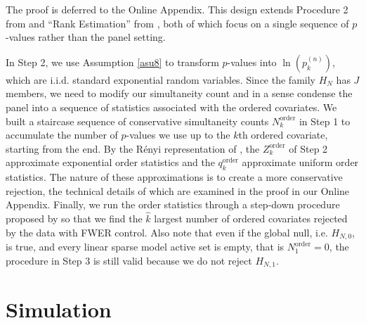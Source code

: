 \documentclass[11pt]{article}
\def\cmt#1{{\textcolor{red}{(#1)}}}
\begin{document}
	
	The proof is deferred to the Online Appendix. This design extends Procedure 2 from \cite{rssb.12122} and ``Rank Estimation'' from \cite{16-AOS1536}, both of which focus on a single sequence of $p$-values rather than the panel setting.
	
	In Step 2, we use Assumption \ref{asu8} to transform $p$-values into $\ln(p^{(n)}_k)$, which are i.i.d. standard exponential random variables. Since the family $H_{N}$ has $J$ members, we need to modify our simultaneity count and in a sense condense the panel into a sequence of statistics associated with the ordered covariates. We built a staircase sequence of conservative simultaneity counts ${N}_k^{\text{order}}$ in Step 1 to accumulate the number of $p$-values we use up to the $k$th ordered covariate, starting from the end. By the R\'enyi representation of \cite{Rnyi1953OnTT}, the ${Z}_k^{\text{order}}$ of Step 2 approximate exponential order statistics and the ${q}_k^{\text{order}}$ approximate uniform order statistics. The nature of these approximations is to create a more conservative rejection, the technical details of which are examined in the proof in our Online Appendix. Finally, we run the order statistics through a step-down procedure proposed by \cite{2336545} so that we find the $\hat{k}$ largest number of ordered covariates rejected by the data with FWER control. Also note that even if the global null, i.e. $H_{N,0}$, is true, and every linear sparse model active set is empty, that is ${N}^{\text{order}}_1=0$, the procedure in Step 3 is still valid because we do not reject $H_{N,1}$.
	
	
	\section{Simulation}\label{sec:simulation}
	
\end{document}
